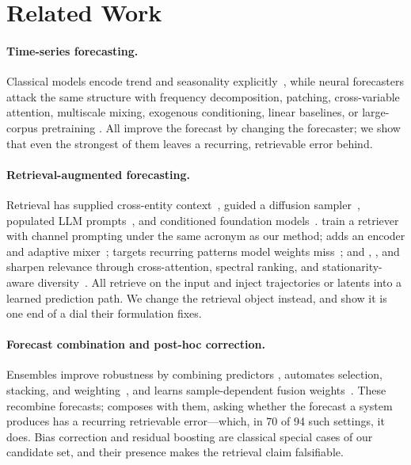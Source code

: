 \section{Related Work}
\label{sec:related}

\paragraph{Time-series forecasting.}
Classical models encode trend and seasonality
explicitly~\citep{anderson1976arima}, while neural forecasters attack the same
structure with frequency decomposition, patching, cross-variable attention,
multiscale mixing, exogenous conditioning, linear baselines, or large-corpus
pretraining \citep{zhou2022fedformer,wu2023timesnet,patchtst,tan2024pattn,
liu2024itransformer,wang2024timemixer,wang2024timexer,dlinear,lightts,
yi2024frets,ansari2024chronos}. All improve the forecast by changing the
forecaster; we show that even the strongest of them leaves a recurring,
retrievable error behind.

\paragraph{Retrieval-augmented forecasting.}
Retrieval has supplied cross-entity context~\citep{yang2022mqretnn}, guided a
diffusion sampler~\citep{liu2024ratd}, populated LLM prompts~\citep{yang2024timerag},
and conditioned foundation models~\citep{tire2024raf}. \citet{zhang2024timeraf} train a retriever with
channel prompting under the same acronym as our method; \tsrag{} adds an encoder
and adaptive mixer~\citep{ning2025tsrag}; \raft{} targets recurring patterns model
weights miss~\citep{han2025raft}; and \crossrag{}, \craftm{}, and \saraf{} sharpen
relevance through cross-attention, spectral ranking, and stationarity-aware
diversity~\citep{lee2026crossrag,kang2026craft,zhou2026saraf}. All retrieve on the
input and inject trajectories or latents into a learned prediction path. We change
the retrieval object instead, and show it is one end of a dial their formulation
fixes.

\paragraph{Forecast combination and post-hoc correction.}
Ensembles improve robustness by combining predictors
\citep{kourentzes2014operator,oliveira2015ensemblebagging,mienye2022ensemble,
caruana2004ensemble,autosklearn_portfolio_zeroshot}, \autogluon{} automates
selection, stacking, and weighting~\citep{shchur2023autogluon}, and \timefuse{}
learns sample-dependent fusion weights~\citep{liu2025timefuse}. These recombine
forecasts; \method{} composes with them, asking whether the forecast a system
produces has a recurring retrievable error---which, in 70 of 94 such settings, it
does. Bias correction and residual boosting are classical special cases of our
candidate set, and their presence makes the retrieval claim falsifiable.
